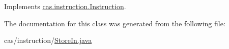 Implements \hyperlink{classcas_1_1instruction_1_1_instruction_a7992edd8d79e1a4e82fb44f4c9abacf9}{cas.\-instruction.\-Instruction}.



The documentation for this class was generated from the following file\-:\begin{DoxyCompactItemize}
\item 
cas/instruction/\hyperlink{_store_in_8java}{Store\-In.\-java}\end{DoxyCompactItemize}
